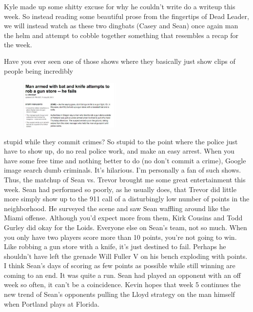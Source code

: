 \documentclass[11pt,letterpaper]{article}
\begin{document}
\newpage
{}
Kyle made up some shitty excuse for why he couldn't write do a writeup this week. So instead reading some beautiful prose from the fingertips of Dead Leader, we will instead watch as these two dingbats (Casey and Sean) once again man the helm and attempt to cobble together something that resembles a recap for the week.

\par\noindent Have you ever seen one of those shows where they basically just show clips of people being incredibly 
\begin{figure}
\centering
\includegraphics[width=0.445\textwidth]{week4-rob.png}
\label{fig:week4-rob}
\vspace{-10pt}
\end{figure} 
\par\noindent 
stupid while they commit crimes? So stupid to the point where the police just have to show up, do no real police work, and make an easy arrest. When you have some free time and nothing better to do (no don't commit a crime), Google image search dumb criminals. It's hilarious. I'm personally a fan of such shows. Thus, the matchup of Sean vs. Trevor brought me some great entertainment this week. Sean had performed so poorly, as he usually does, that Trevor did little more simply show up to the 911 call of a disturbingly low number of points in the neighborhood. He surveyed the scene and saw Sean waffling around like the Miami offense. Although you'd expect more from them, Kirk Cousins and Todd Gurley did okay for the Loids. Everyone else on Sean's team, not so much. When you only have two players score more than 10 points, you're not going to win. Like robbing a gun store with a knife, it's just destined to fail. Perhaps he shouldn't have left the grenade Will Fuller V on his bench exploding with points. I think Sean's days of scoring as few points as possible while still winning are coming to an end. It was quite a run. Sean had played an opponent with an off week so often, it can't be a coincidence. Kevin hopes that week 5 continues the new trend of Sean's opponents pulling the Lloyd strategy on the man himself when Portland plays at Florida. 
\end{document}
